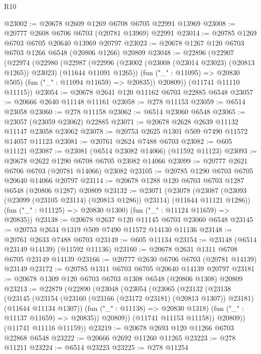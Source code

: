 \begin{lexlean}{R10}
\begin{coremodule}
{{{{{{{{{{{{{{{{{{{{{{{{{{{{{{{{{{{{{{{{{{{{{{{{{{{{{{{{{{{{{{{{{{{{{{{{{{{{{{{{{{{{@23002 := @20678 @2609 @1269 @6708 @6705 @22991 @13969
@23008 := @20777 @2608 @6706 @6703 (@20781 @13969) @22991
@23014 := @20785 @1269 @6703 @6705 @20640 @13969 @20797
@23023 := @20678 @1267 @120 @6703 @6703 @1266 @6548 (@20806 @1266) @20809
@23048 := @22896
    (@22907
      (@22974
        (@22980
          (@22987
            (@22996 (@23002 (@23008 (@23014 @23023) (@20813 @1265)) @23023) (@11644 @11091 @1265))
            (fun ("_" : @11095) => @20830 @505)
            (fun ("_" : @11094 @11659) => @20835))
          @20809))
      (@11741 @11110 @11115))
@23054 := @20678 @2641 @120 @11162 @6703 @22885 @6548
@23057 := @20666 @2640 @11148 @11161
@23058 := @278 @11153
@23059 := @6514 @23058
@23060 := @278 @11158
@23062 := @6514 @23060 @6548
@23065 := @23057 (@23059 @23062) @22885
@23071 := @20678 @2628 @2639 @11132 @11147 @23058 @23062
@23078 := @20753 @2625 @1301 @509 @7490 @11572 @14057 @11123
@23081 := @20761 @2624 @7488 @6703
@23082 := @605 @11121
@23087 := @23081 (@6514 @23082 @14066) (@11592 @11123)
@23093 := @20678 @2622 @1290 @6708 @6705 @23082 @14066
@23099 := @20777 @2621 @6706 @6703 (@20781 @14066) @23082
@23105 := @20785 @1290 @6703 @6705 @20640 @14066 @20797
@23114 := @20678 @1288 @120 @6703 @6703 @1287 @6548 (@20806 @1287) @20809
@23132 := @23071
    (@23078
      (@23087 (@23093 (@23099 (@23105 @23114) (@20813 @1286)) @23114) (@11644 @11121 @1286))
      (fun ("_" : @11125) => @20830 @1300)
      (fun ("_" : @11124 @11659) => @20835))
@23138 := @20678 @2637 @120 @11145 @6703 @23060 @6548
@23145 := @20753 @2634 @1319 @509 @7490 @11572 @14130 @11136
@23148 := @20761 @2633 @7488 @6703
@23149 := @605 @11134
@23154 := @23148 (@6514 @23149 @14139) (@11592 @11136)
@23160 := @20678 @2631 @1311 @6708 @6705 @23149 @14139
@23166 := @20777 @2630 @6706 @6703 (@20781 @14139) @23149
@23172 := @20785 @1311 @6703 @6705 @20640 @14139 @20797
@23181 := @20678 @1309 @120 @6703 @6703 @1308 @6548 (@20806 @1308) @20809
@23213 := @22879
    (@22890
      (@23048
        (@23054
          (@23065
            (@23132
              (@23138
                (@23145
                  (@23154
                    (@23160 (@23166 (@23172 @23181) (@20813 @1307)) @23181)
                    (@11644 @11134 @1307))
                  (fun ("_" : @11138) => @20830 @1318)
                  (fun ("_" : @11137 @11659) => @20835))
                @20809))
            (@11741 @11153 @11158))
          @20809))
      (@11741 @11116 @11159))
@23219 := @20678 @2693 @120 @11266 @6703 @22868 @6548
@23222 := @20666 @2692 @11260 @11265
@23223 := @278 @11211
@23224 := @6514 @23223
@23225 := @278 @11254
}}}}}}}}}}}}}}}}}}}}}}}}}}}}}}}}}}}}}}}}}}}}}}}}}}}}}}}}}}}}}}}}}}}}}}}}}}}}}}}}}}}}
\end{coremodule}
\end{lexlean}
